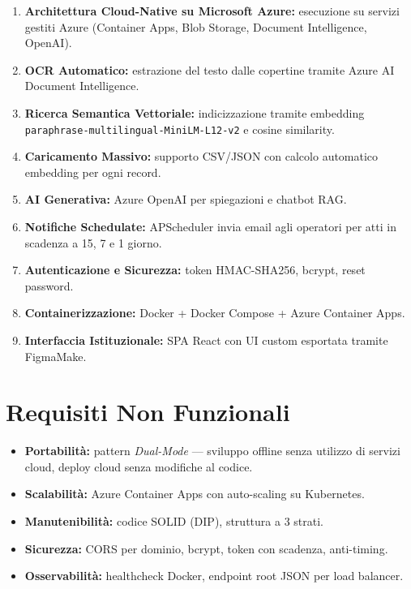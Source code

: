 \documentclass[12pt,a4paper,oneside]{report}
\begin{document}
\begin{enumerate}[leftmargin=2cm]
    \item \textbf{Architettura Cloud-Native su Microsoft Azure:} esecuzione su servizi
          gestiti Azure (Container Apps, Blob Storage, Document Intelligence, OpenAI).
    \item \textbf{OCR Automatico:} estrazione del testo dalle copertine tramite Azure AI
          Document Intelligence.
    \item \textbf{Ricerca Semantica Vettoriale:} indicizzazione tramite embedding
          \texttt{paraphrase-multilingual-MiniLM-L12-v2} e cosine similarity.
    \item \textbf{Caricamento Massivo:} supporto CSV/JSON con calcolo
          automatico embedding per ogni record.
    \item \textbf{AI Generativa:} Azure OpenAI per spiegazioni e chatbot RAG.
    \item \textbf{Notifiche Schedulate:} APScheduler invia email agli operatori per
          atti in scadenza a 15, 7 e 1 giorno.
    \item \textbf{Autenticazione e Sicurezza:} token HMAC-SHA256, bcrypt, reset password.
    \item \textbf{Containerizzazione:} Docker + Docker Compose + Azure Container Apps.
    \item \textbf{Interfaccia Istituzionale:} SPA React con UI custom esportata tramite FigmaMake.
\end{enumerate}

\section{Requisiti Non Funzionali}

\begin{itemize}
    \item \textbf{Portabilit\`{a}:} pattern \textit{Dual-Mode} --- sviluppo offline senza utilizzo di servizi cloud,
          deploy cloud senza modifiche al codice.
    \item \textbf{Scalabilit\`{a}:} Azure Container Apps con auto-scaling su Kubernetes.
    \item \textbf{Manutenibilit\`{a}:} codice SOLID (DIP), struttura a 3 strati.
    \item \textbf{Sicurezza:} CORS per dominio, bcrypt, token con scadenza, anti-timing.
    \item \textbf{Osservabilit\`{a}:} healthcheck Docker, endpoint root JSON per load balancer.
\end{itemize}
\end{document}
